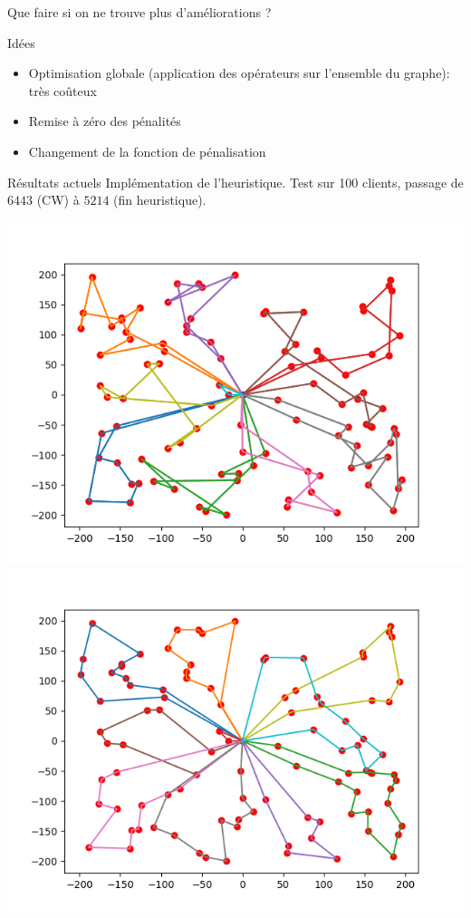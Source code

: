 \documentclass{beamer}
\begin{document}
\begin{frame}{Que faire si on ne trouve plus d'améliorations ?}
\begin{block}{Idées}

\begin{itemize}
\item Optimisation globale (application des opérateurs sur l'ensemble du graphe): très coûteux
\item Remise à zéro des pénalités
\item Changement de la fonction de pénalisation
\end{itemize}

\end{block}
\end{frame}

\begin{frame}{Résultats actuels}
Implémentation de l'heuristique.
Test sur 100 clients, passage de $6443$ (CW) à $5214$ (fin heuristique).
\begin{center}
\includegraphics[scale=0.32]{test2_heuristic_init.png}
\includegraphics[scale=0.32]{test2_heuristic_res.png}
\end{center}
\end{frame}
\end{document}
